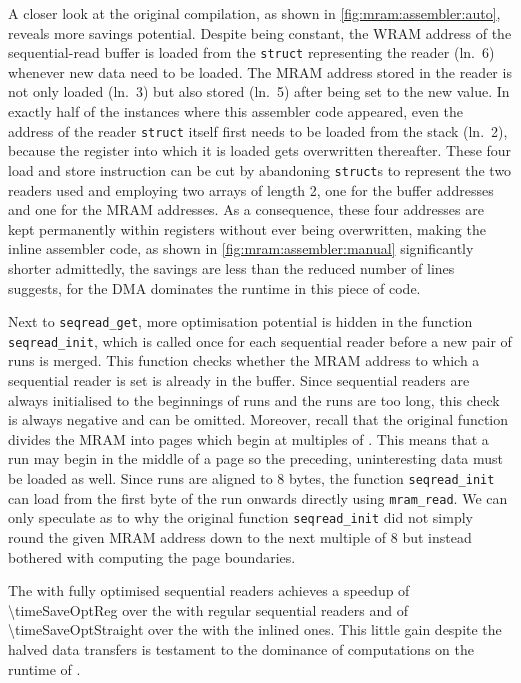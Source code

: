 A closer look at the original compilation, as shown in \cref{fig:mram:assembler:auto}, reveals more savings potential.
Despite being constant, the \ac{WRAM} address of the sequential-read buffer is loaded from the \lstinline[keywords={}]|struct| representing the reader (ln.~6) whenever new data need to be loaded.
The \ac{MRAM} address stored in the reader is not only loaded (ln.~3) but also stored (ln.~5) after being set to the new value.
In exactly half of the instances where this assembler code appeared, even the address of the reader \lstinline[keywords={}]|struct| itself first needs to be loaded from the stack (ln.~2), because the register into which it is loaded gets overwritten thereafter.
These four load and store instruction can be cut by abandoning \lstinline[keywords={}]|struct|s to represent the two readers used and employing two arrays of length 2, one for the buffer addresses and one for the \ac{MRAM} addresses.
As a consequence, these four addresses are kept permanently within registers without ever being overwritten, making the inline assembler code, as shown in \cref{fig:mram:assembler:manual} significantly shorter \Dash admittedly, the savings are less than the reduced number of lines suggests, for the \ac{DMA} dominates the runtime in this piece of code.

Next to \lstinline|seqread_get|, more optimisation potential is hidden in the function \lstinline|seqread_init|, which is called once for each sequential reader before a new pair of runs is merged.
This function checks whether the \ac{MRAM} address to which a sequential reader is set is already in the buffer.
Since sequential readers are always initialised to the beginnings of runs and the runs are too long, this check is always negative and can be omitted.
Moreover, recall that the original function divides the \ac{MRAM} into pages which begin at multiples of \seqreadcachesize{}.
This means that a run may begin in the middle of a page so the preceding, uninteresting data must be loaded as well.
Since runs are aligned to 8 bytes, the function \lstinline|seqread_init| can load from the first byte of the run onwards directly using \lstinline|mram_read|.
We can only speculate as to why the original function \lstinline|seqread_init| did not simply round the given \ac{MRAM} address down to the next multiple of 8 but instead bothered with computing the page boundaries.

The \MS{} with fully optimised sequential readers achieves a speedup of \num[round-mode=places, round-precision=2]{\timeSaveOptReg} over the \MS{} with regular sequential readers and of \num[round-mode=places, round-precision=2]{\timeSaveOptStraight} over the \MS{} with the inlined ones.
This little gain despite the halved data transfers is testament to the dominance of computations on the runtime of \MS{}.

